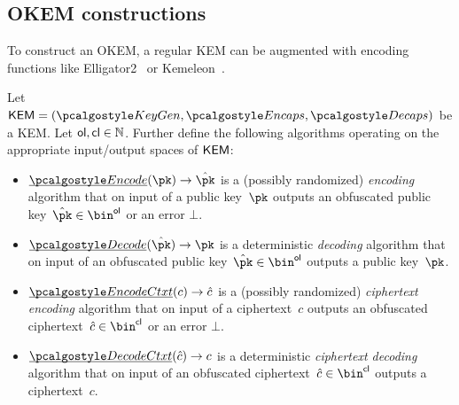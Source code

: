 
\subsection{OKEM constructions}

To construct an OKEM, a regular KEM can be augmented with encoding functions like \textsf{Elligator2}~\cite{CCS:BHKL13} or \textsf{Kemeleon}~\cite[Sec. 2.4]{CCS:GunSteVei24}.

\begin{definition}\label{def:keygen-encap-then-encode}
\label{def:first-keygen-success}
\label{def:first-encap-success}
    Let $\KEM = (\kgen, \encaps, \decaps)$ be a KEM.
    Let $\mathsf{ol}, \mathsf{cl} \in \mathbb N$.
    Further define the following algorithms operating on the appropriate input/output spaces of $\mathsf{KEM}$:
    \begin{itemize}
        \item $\ul{\encode}(\pk) \to \pkobf$
        is a (possibly randomized) \emph{encoding} algorithm that on input of a public key~$\pk$ outputs an obfuscated public key~$\pkobf \in \bin^{\obfpklen}$ or an error $\bot$.
        \item $\ul{\decode}(\pkobf) \to \pk$
        is a deterministic \emph{decoding} algorithm that on input of an obfuscated public key~$\pkobf \in \bin^{\obfpklen}$ outputs a public key~$\pk$.
        \item $\ul{\encodectxt}(c) \to \hat c$
        is a (possibly randomized) \emph{ciphertext encoding} algorithm that on input of a ciphertext~$c$ outputs an obfuscated ciphertext~$\hat c \in \bin^{\obfctxtlen}$ or an error $\bot$.
        \item $\ul{\decodectxt}(\hat c) \to c$
        is a deterministic \emph{ciphertext decoding} algorithm that on input of an obfuscated ciphertext~$\hat c \in \bin^{\obfctxtlen}$ outputs a ciphertext~$c$.
    \end{itemize}


\end{definition}
